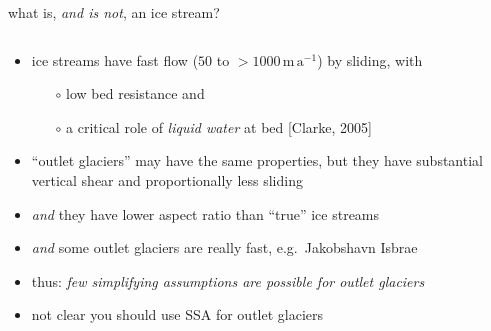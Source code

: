 \begin{frame}{what is, \emph{and is not}, an ice stream?}

\begin{columns}
\begin{column}{0.6\textwidth}
\begin{itemize}
\item ice streams have fast flow ($50$ to $>1000 \,\text{m}\,\text{a}^{-1}$) by sliding, with
  \small
  \begin{itemize}
  \item[$\circ$] low bed resistance and
  \item[$\circ$] a critical role of \emph{liquid water} at bed [Clarke, 2005]\nocite{Clarke05}
  \end{itemize}
  \normalsize
\item ``outlet glaciers'' may have the same properties, but they have substantial vertical shear and proportionally less sliding
\item \emph{and} they have lower aspect ratio than ``true'' ice streams
\item \emph{and} some outlet glaciers are really fast, e.g.~Jakobshavn Isbrae
\item thus: \emph{few simplifying assumptions are possible for outlet glaciers}
\item not clear you should use SSA for outlet glaciers
\end{itemize}
\end{column}

\begin{column}{0.4\textwidth}
\end{column}
\end{columns}
\end{frame}


